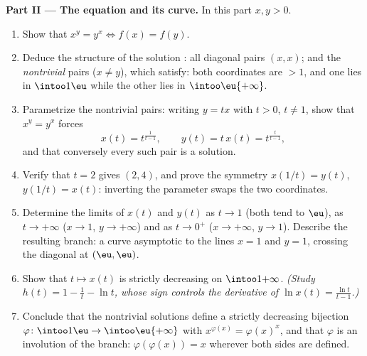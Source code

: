 \begin{problem}
\medskip
\noindent\textbf{Part II --- The equation and its curve.} In this
part $x, y > 0$.
\begin{enumerate}[resume]
  \item Show that $x^y = y^x \iff f(x) = f(y)$.
  \item Deduce the structure of the solution : all diagonal
        pairs $(x, x)$; and the \emph{nontrivial} pairs ($x \neq
        y$), which satisfy: both coordinates are $> 1$, and one
        lies in $\intoo1\eu$ while the other lies in
        $\intoo\eu{+\infty}$.
  \item Parametrize the nontrivial pairs: writing $y = tx$ with $t
        > 0$, $t \neq 1$, show that $x^y = y^x$ forces
        \[
        x(t) = t^{\frac1{t-1}},
        \qquad
        y(t) = t\,x(t) = t^{\frac{t}{t-1}},
        \]
        and that conversely every such pair is a solution.
  \item Verify that $t = 2$ gives $(2, 4)$, and prove the symmetry
        $x(1/t) = y(t)$, $y(1/t) = x(t)$: inverting the parameter
        swaps the two coordinates.
  \item Determine the limits of $x(t)$ and $y(t)$ as $t \to 1$
        (both tend to $\eu$), as $t \to +\infty$ ($x \to 1$, $y
        \to +\infty$) and as $t \to 0^+$ ($x \to +\infty$, $y \to
        1$). Describe the resulting branch: a curve asymptotic to
        the lines $x = 1$ and $y = 1$, crossing the diagonal at
        $(\eu, \eu)$.
  \item Show that $t \mapsto x(t)$ is strictly decreasing on
        $\intoo1{+\infty}$. \emph{(Study $h(t) = 1 - \frac1t - \ln
        t$, whose sign controls the derivative of $\ln x(t) =
        \frac{\ln t}{t - 1}$.)}
  \item Conclude that the nontrivial solutions define a strictly
        decreasing bijection $\varphi \colon \intoo1\eu \to
        \intoo\eu{+\infty}$ with $x^{\varphi(x)} = \varphi(x)^x$,
        and that $\varphi$ is an involution of the branch:
        $\varphi(\varphi(x)) = x$ wherever both sides are defined.
\end{enumerate}


\end{problem}
